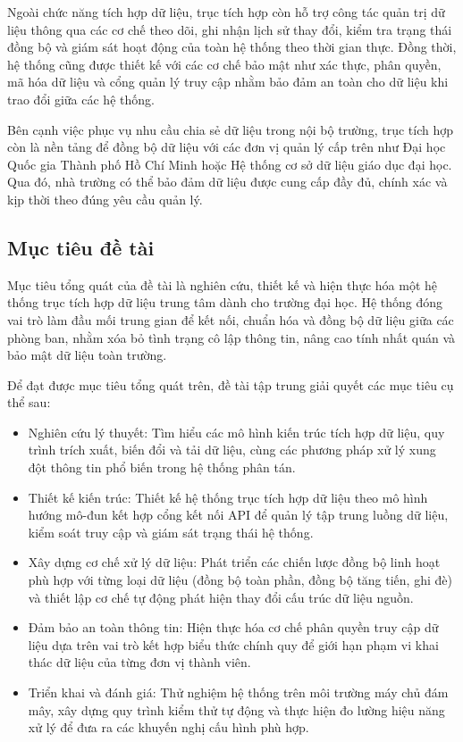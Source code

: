 Ngoài chức năng tích hợp dữ liệu, trục tích hợp còn hỗ trợ công tác quản trị dữ liệu thông qua các cơ chế theo dõi, ghi nhận lịch sử thay đổi, kiểm tra trạng thái đồng bộ và giám sát hoạt động của toàn hệ thống theo thời gian thực. Đồng thời, hệ thống cũng được thiết kế với các cơ chế bảo mật như xác thực, phân quyền, mã hóa dữ liệu và cổng quản lý truy cập nhằm bảo đảm an toàn cho dữ liệu khi trao đổi giữa các hệ thống.

Bên cạnh việc phục vụ nhu cầu chia sẻ dữ liệu trong nội bộ trường, trục tích hợp còn là nền tảng để đồng bộ dữ liệu với các đơn vị quản lý cấp trên như Đại học Quốc gia Thành phố Hồ Chí Minh hoặc Hệ thống cơ sở dữ liệu giáo dục đại học. Qua đó, nhà trường có thể bảo đảm dữ liệu được cung cấp đầy đủ, chính xác và kịp thời theo đúng yêu cầu quản lý.

\subsection{Mục tiêu đề tài}
Mục tiêu tổng quát của đề tài là nghiên cứu, thiết kế và hiện thực hóa một hệ thống trục tích hợp dữ liệu trung tâm dành cho trường đại học. Hệ thống đóng vai trò làm đầu mối trung gian để kết nối, chuẩn hóa và đồng bộ dữ liệu giữa các phòng ban, nhằm xóa bỏ tình trạng cô lập thông tin, nâng cao tính nhất quán và bảo mật dữ liệu toàn trường.

Để đạt được mục tiêu tổng quát trên, đề tài tập trung giải quyết các mục tiêu cụ thể sau:
\begin{itemize}
  \item Nghiên cứu lý thuyết: Tìm hiểu các mô hình kiến trúc tích hợp dữ liệu, quy trình trích xuất, biến đổi và tải dữ liệu, cùng các phương pháp xử lý xung đột thông tin phổ biến trong hệ thống phân tán.
  \item Thiết kế kiến trúc: Thiết kế hệ thống trục tích hợp dữ liệu theo mô hình hướng mô-đun kết hợp cổng kết nối API để quản lý tập trung luồng dữ liệu, kiểm soát truy cập và giám sát trạng thái hệ thống.
  \item Xây dựng cơ chế xử lý dữ liệu: Phát triển các chiến lược đồng bộ linh hoạt phù hợp với từng loại dữ liệu (đồng bộ toàn phần, đồng bộ tăng tiến, ghi đè) và thiết lập cơ chế tự động phát hiện thay đổi cấu trúc dữ liệu nguồn.
  \item Đảm bảo an toàn thông tin: Hiện thực hóa cơ chế phân quyền truy cập dữ liệu dựa trên vai trò kết hợp biểu thức chính quy để giới hạn phạm vi khai thác dữ liệu của từng đơn vị thành viên.
  \item Triển khai và đánh giá: Thử nghiệm hệ thống trên môi trường máy chủ đám mây, xây dựng quy trình kiểm thử tự động và thực hiện đo lường hiệu năng xử lý để đưa ra các khuyến nghị cấu hình phù hợp.
\end{itemize}

